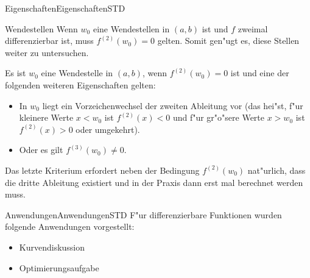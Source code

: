 \begin{MXContent}{Eigenschaften}{Eigenschaften}{STD}
\begin{MXInfo}{Wendestellen}
Wenn $w_0$ eine Wendestellen in $(a, b)$ ist und $f$ zweimal differenzierbar 
ist, muss $f^{(2)}(w_0) = 0$ gelten. Somit gen"ugt es, diese Stellen weiter
zu untersuchen.

Es ist $w_0$ eine Wendestelle in $(a, b)$, wenn  $f^{(2)}(w_0) = 0$ ist und 
eine der folgenden weiteren Eigenschaften gelten:
\begin{itemize}
\item In $w_0$ liegt ein Vorzeichenwechsel der zweiten Ableitung vor (das hei"st,
f"ur kleinere Werte $x < w_0$ ist $f^{(2)}(x) < 0$ und f"ur gr"o"sere Werte 
$x > w_0$ ist $f^{(2)}(x) > 0$ oder umgekehrt).
%
\item Oder es gilt $f^{(3)}(w_0) \neq 0$.
\end{itemize}
Das letzte Kriterium erfordert neben der Bedingung $f^{(2)}(w_0)$ nat"urlich, 
dass die dritte Ableitung existiert und in der Praxis dann erst mal berechnet 
werden muss.
\end{MXInfo}
\end{MXContent}

\begin{MXContent}{Anwendungen}{Anwendungen}{STD}
F"ur differenzierbare Funktionen wurden folgende Anwendungen vorgestellt:
\begin{itemize}
\item Kurvendiskussion
\item Optimierungsaufgabe
\end{itemize}
\end{MXContent}


